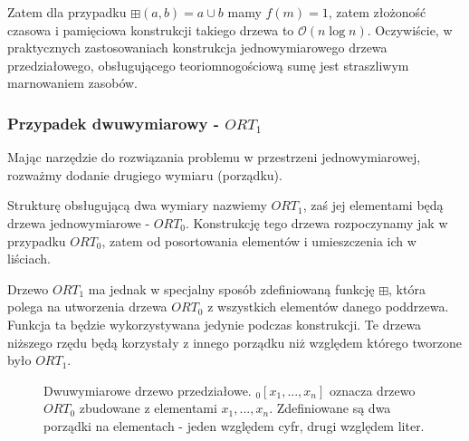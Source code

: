 \documentclass[a4paper]{article}
\begin{document}
Zatem dla przypadku $\boxplus(a, b) = a \cup b$ mamy $f(m)=1$, zatem złożoność czasowa i pamięciowa konstrukcji takiego drzewa to $\mathcal{O}(n \log{} n)$. Oczywiście, w praktycznych zastosowaniach konstrukcja jednowymiarowego drzewa przedziałowego, obsługującego teoriomnogościową sumę jest straszliwym marnowaniem zasobów.

\subsubsection{Przypadek dwuwymiarowy - $ORT_1$}

Mając narzędzie do rozwiązania problemu w przestrzeni jednowymiarowej, rozważmy dodanie drugiego wymiaru (porządku).

Strukturę obsługującą dwa wymiary nazwiemy $ORT_1$, zaś jej elementami będą drzewa jednowymiarowe - $ORT_0$. Konstrukcję tego drzewa rozpoczynamy jak w przypadku $ORT_0$, zatem od posortowania elementów i umieszczenia ich w liściach.

Drzewo $ORT_1$ ma jednak w specjalny sposób zdefiniowaną funkcję $\boxplus$, która polega na utworzenia drzewa $ORT_0$ z wszystkich elementów danego poddrzewa. Funkcja ta będzie wykorzystywana jedynie podczas konstrukcji. Te drzewa niższego rzędu będą korzystały z innego porządku niż względem którego tworzone było $ORT_1$.

\begin{figure}[!h]
\centering
{}
\caption{Dwuwymiarowe drzewo przedziałowe. $_0[x_1, ..., x_n]$ oznacza drzewo $ORT_0$ zbudowane z elementami $x_1, ..., x_n$. Zdefiniowane są dwa porządki na elementach - jeden względem cyfr, drugi względem liter.}
\label{fig:tree2}
\end{figure}
\end{document}
